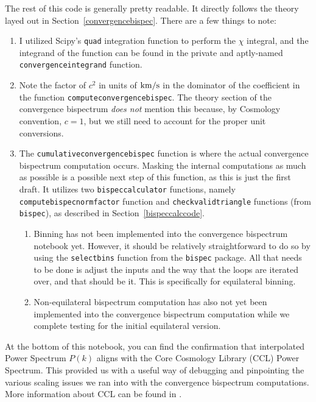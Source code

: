 \documentclass[11pt]{article}
\renewcommand{\_}[1]{\underline{ #1 }}
\newcommand{\us}{\textunderscore}
\begin{document}
{The rest of this code is generally pretty readable. It directly follows the theory layed out in Section~\ref{convergencebispec}. There are a few things to note:
\begin{enumerate}
    \item I utilized Scipy's \texttt{quad} integration function to perform the $\chi$ integral, and the integrand of the function can be found in the private and aptly-named \texttt{\us convergence\us integrand} function.
    \item Note the factor of $c^2$ in units of $\rm{km/s}$ in the dominator of the coefficient in the function \texttt{compute\us convergence\us bispec}. The theory section of the convergence bispectrum \textit{does not} mention this because, by Cosmology convention, $c = 1$, but we still need to account for the proper unit conversions.
    \item The \texttt{cumulative\us convergence\us bispec} function is where the actual convergence bispectrum computation occurs. Masking the internal computations as much as possible is a possible next step of this function, as this is just the first draft. It utilizes two \texttt{bispec\us calculator} functions, namely \texttt{compute\us bispec\us norm\us factor} function and \texttt{check\us valid\us triangle} functions (from \texttt{bispec}), as described in Section~\ref{bispeccalccode}.
    \begin{enumerate}
        \item Binning has not been implemented into the convergence bispectrum notebook yet. However, it should be relatively straightforward to do so by using the \texttt{select\us bins} function from the \texttt{bispec} package. All that needs to be done is adjust the inputs and the way that the loops are iterated over, and that should be it. This is specifically for equilateral binning.
        \item Non-equilateral bispectrum computation has also not yet been implemented into the convergence bispectrum computation while we complete testing for the initial equilateral version.
    \end{enumerate}
\end{enumerate}

At the bottom of this notebook, you can find the confirmation that interpolated Power Spectrum $P(k)$ aligns with the Core Cosmology Library (CCL) Power Spectrum. This provided us with a useful way of debugging and pinpointing the various scaling issues we ran into with the convergence bispectrum computations. More information about CCL can be found in \cite{CCL}.

}
\end{document}
